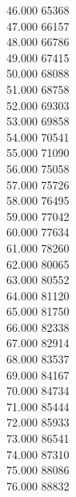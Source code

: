 { 46.000	65368 \\
 47.000	66157 \\
 48.000	66786 \\
 49.000	67415 \\
 50.000	68088 \\
 51.000	68758 \\
 52.000	69303 \\
 53.000	69858 \\
 54.000	70541 \\
 55.000	71090 \\
 56.000	75058 \\
 57.000	75726 \\
 58.000	76495 \\
 59.000	77042 \\
 60.000	77634 \\
 61.000	78260 \\
 62.000	80065 \\
 63.000	80552 \\
 64.000	81120 \\
 65.000	81750 \\
 66.000	82338 \\
 67.000	82914 \\
 68.000	83537 \\
 69.000	84167 \\
 70.000	84734 \\
 71.000	85444 \\
 72.000	85933 \\
 73.000	86541 \\
 74.000	87310 \\
 75.000	88086 \\
 76.000	88832 \\
}
